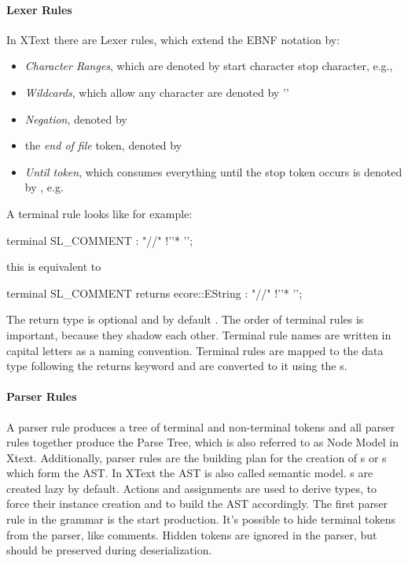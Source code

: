 \paragraph{Lexer Rules}
In XText there are Lexer rules, which extend the EBNF notation by:
\begin{itemize}
	\item \emph{Character Ranges}, which are denoted by start character  stop character, e.g., 
	\item \emph{Wildcards}, which allow any character are denoted by ''
	\item \emph{Negation}, denoted by \code{!}
	\item the \emph{end of file} token, denoted by 
	\item \emph{Until token}, which consumes everything until the stop token occurs is denoted by \code{->}, e.g. 
\end{itemize}
A terminal rule looks like for example:
\begin{xtxt}
terminal SL_COMMENT : "//" !'\n'* '\n';
\end{xtxt}
this is equivalent to 
\begin{xtxt}
terminal SL_COMMENT returns ecore::EString : "//" !'\n'* '\n';
\end{xtxt}
The return type is optional and by default . The order of terminal rules is important, because they shadow each other. Terminal rule names are written in capital letters as a naming convention. Terminal rules are mapped to the data type following the returns keyword and are converted to it using the s.

\paragraph{Parser Rules}
A parser rule produces a tree of terminal and non-terminal tokens and all parser rules together produce the Parse Tree, which is also referred to as Node Model in Xtext. Additionally, parser rules are the building plan for the creation of s or s which form the AST. In XText the AST is also called semantic model. s are created lazy by default. Actions and assignments are used to derive types, to force their instance creation and to build the AST accordingly. The first parser rule in the grammar is the start production. It's possible to hide terminal tokens from the parser, like comments. Hidden tokens are ignored in the parser, but should be preserved during deserialization.

